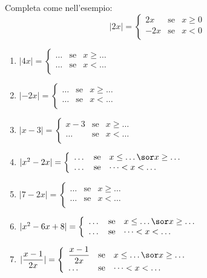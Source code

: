 \begin{esercizio}\label{ese:03.1}
Completa come nell'esempio:
\[
|2x|=
        \left\lbrace 
        \begin{array}{lcl}
        2x & \text{se}& x\geq 0\\
        -2x & \text{se}& x< 0\\
        \end{array}
        \right.
\]

\begin{enumerate}
\item 
\(
|4x|=
\left\lbrace 
\begin{array}{lcl}
\dots & \text{se}& x\geq\dots\\
\dots & \text{se}& x<\dots\\
\end{array}
\right.
\)
\item 
\(
|-2x|=
\left\lbrace 
\begin{array}{lcl}
\dots & \text{se}& x\geq\dots\\
\dots & \text{se}& x<\dots\\
\end{array}
\right.
\)
\item 
\(
|x-3|=
\left\lbrace 
\begin{array}{lcl}
x-3 & \text{se}& x\geq\dots\\
\dots & \text{se}& x<\dots\\
\end{array}
\right.
\)
\item 
\(
|x^2-2x|=
\left\lbrace 
\begin{array}{lcl}
\dots & \text{se}& x\leq\dots \sor x\geq\dots\\
\dots & \text{se}& \dots <x<\dots\\
\end{array}
\right.
\)
\item 
\(
|7-2x|=
\left\lbrace 
\begin{array}{lcl}
\dots & \text{se}& x\geq\dots\\
\dots & \text{se}& x<\dots\\
\end{array}
\right.
\)
\item 
\(
|x^2-6x+8|=
\left\lbrace 
\begin{array}{lcl}
\dots & \text{se}& x\leq\dots \sor x\geq\dots\\
\dots & \text{se}& \dots <x<\dots\\
\end{array}
\right.
\)
\item 
\(
|\dfrac{x-1}{2x}|=
\left\lbrace 
\begin{array}{lcl}
\dfrac{x-1}{2x} & \text{se}& x\leq\dots \sor x\geq\dots\\
\dots & \text{se}& \dots <x<\dots\\
\end{array}
\right.
\)
\end{enumerate}
\end{esercizio}

